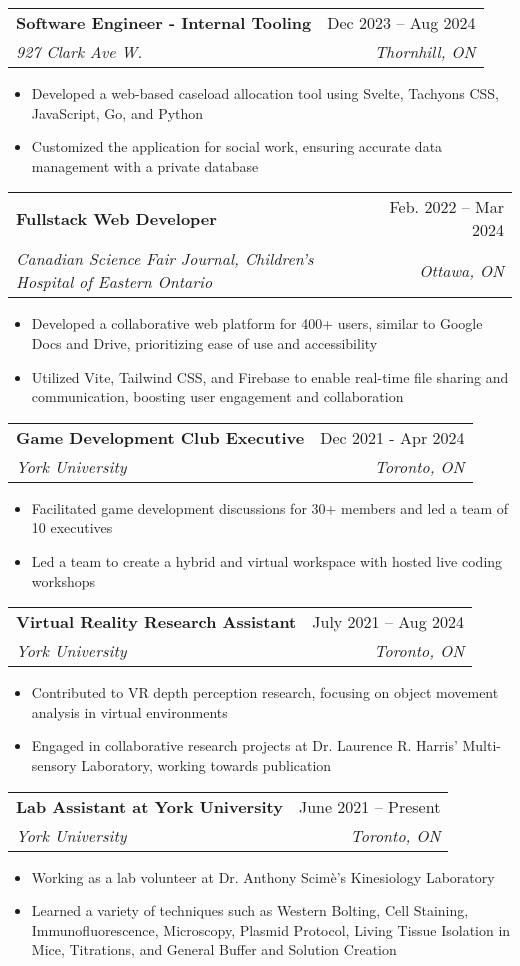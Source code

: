 \documentclass[letterpaper,11pt]{article}
\makeatletter
\newcommand{\resumeItem}[1]{
  \item\small{
    {#1 \vspace{-2pt}}
  }
}
\newcommand{\resumeSubheading}[4]{
  \vspace{-2pt}\item
    \begin{tabular*}{0.97\textwidth}[t]{l@{\extracolsep{\fill}}r}
      \textbf{#1} & #2 \\
      \textit{\small#3} & \textit{\small #4} \\
    \end{tabular*}\vspace{-7pt}
}
\newcommand{\resumeItemListStart}{\begin{itemize}}
\newcommand{\resumeItemListEnd}{\end{itemize}\vspace{-5pt}}
\makeatother
\begin{document}
        
    \resumeSubheading
      {Software Engineer - Internal Tooling}{Dec 2023 -- Aug 2024}
      {927 Clark Ave W.}{Thornhill, ON}
      \resumeItemListStart
      \resumeItem{Developed a web-based caseload allocation tool using Svelte, Tachyons CSS, JavaScript, Go, and Python}
        \resumeItem{Customized the application for social work, ensuring accurate data management with a private database}
    \resumeItemListEnd
        
    \resumeSubheading
      {Fullstack Web Developer}{Feb. 2022 -- Mar 2024}
      {Canadian Science Fair Journal, Children’s Hospital of Eastern Ontario}{Ottawa, ON}
      \resumeItemListStart
        \resumeItem{Developed a collaborative web platform for 400+ users, similar to Google Docs and Drive, prioritizing ease of use and accessibility}
        \resumeItem{Utilized Vite, Tailwind CSS, and Firebase to enable real-time file sharing and communication, boosting user engagement and collaboration}
      \resumeItemListEnd
    
    

    

    \resumeSubheading
      {Game Development Club Executive}{Dec 2021 - Apr 2024}     
      {York University}{Toronto, ON}
      \resumeItemListStart
        \resumeItem{Facilitated game development discussions for 30+ members and led a team of 10 executives}
        \resumeItem{Led a team to create a hybrid and virtual workspace with hosted live coding workshops}
    \resumeItemListEnd
    
    \resumeSubheading
      {Virtual Reality Research Assistant}{July 2021 -- Aug 2024}
      {York University}{Toronto, ON}
      \resumeItemListStart
        \resumeItem{Contributed to VR depth perception research, focusing on object movement analysis in virtual environments}
        \resumeItem{Engaged in collaborative research projects at Dr. Laurence R. Harris' Multi-sensory Laboratory, working towards publication}
    \resumeItemListEnd

    
    \resumeSubheading
      {Lab Assistant at York University}{June 2021 -- Present}
      {York University}{Toronto, ON}
      \resumeItemListStart
        \resumeItem{Working as a lab volunteer at Dr. Anthony Scimè's Kinesiology Laboratory}
        \resumeItem{Learned a variety of techniques such as Western Bolting, Cell Staining, Immunofluorescence, Microscopy, Plasmid Protocol, Living Tissue Isolation in Mice, Titrations, and General Buffer and Solution Creation }
    \resumeItemListEnd
    
\end{document}
